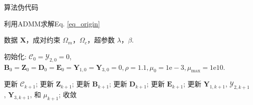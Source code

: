 \documentclass{beamer}
\begin{document}
\begin{frame}{算法伪代码}
\begin{algorithm}[H]
        \small
		\renewcommand{\algorithmicrequire}{\textbf{输入：}}
		\renewcommand{\algorithmicensure}{\textbf{Output:}}
		\caption{利用ADMM求解Eq. \eqref{eq_origin}}
		\label{alg1}
		\begin{algorithmic}[1]
			\REQUIRE 数据 $\mathbf{X}$，成对约束 $\Omega_{m}$，$\Omega_{c}$，超参数 $\lambda$，$\beta$. 
			
			\STATE 初始化: $\mathcal{\mathcal{C}}_{0}\!=\!\mathcal{Y}_{2,0}\!=\!0$, $\mathbf{B}_{0}\!=\!\mathbf{Z}_{0}=\mathbf{D}_{0}\!=\!\mathbf{E}_{0}\!=\!\mathbf{Y}_{1,0}\!=\!\mathbf{Y}_{3,0}\!=\!0, \rho\!=\!1.1, \mu_{0}\!=\!1 \mathrm{e}\!-\!3, \mu_{\max }\!=\!1 \mathrm{e} 10$.
			
			\REPEAT
			
			\STATE 更新 $\mathcal{C}_{k+1}$;
			\STATE 更新 $\mathbf{Z}_{k+1}$;
			\STATE 更新 $\mathbf{B}_{k+1}$;
			\STATE 更新 $\mathbf{D}_{k+1}$;
			\STATE 更新 $\mathbf{E}_{k+1}$;
			\STATE 更新 $\mathbf{Y}_{1,k+1}$, $\mathcal{Y}_{2,k+1}$, $\mathbf{Y}_{3,k+1}$, 和 $\mu_{k+1}$;
			\UNTIL 收敛
		\end{algorithmic}  
	\end{algorithm}
\end{frame}


\end{document}

